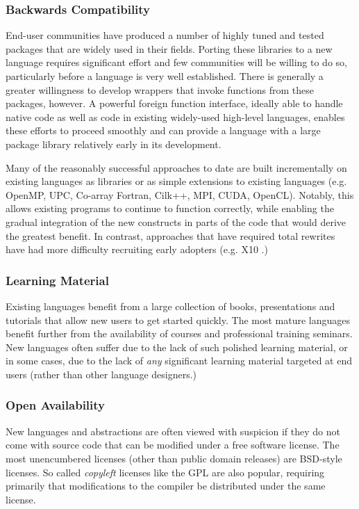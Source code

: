 \documentclass[12pt]{article}
\begin{document}
\subsubsection{Backwards Compatibility}
End-user communities have produced a number of highly tuned and tested packages that are widely used in their fields. Porting these libraries to a new language requires significant effort and few communities will be willing to do so, particularly before a language is very well established. There is generally a greater willingness to develop wrappers that invoke functions from these packages, however. A powerful foreign function interface, ideally able to handle native code as well as code in existing widely-used high-level languages, enables these efforts to proceed smoothly and can provide a language with a large package library relatively early in its development. 

Many of the reasonably successful approaches to date are built incrementally on existing languages as libraries or as simple  extensions to existing languages (e.g. OpenMP, UPC, Co-array Fortran, Cilk++, MPI, CUDA, OpenCL). Notably, this allows existing programs to continue to function correctly, while enabling the gradual integration of the new constructs in parts of the code that would derive the greatest benefit. In contrast, approaches that have required total rewrites have had more difficulty recruiting early adopters (e.g. X10 \cite{charles2005x10}.)

\subsubsection{Learning Material}
Existing languages benefit from a large collection of books, presentations and tutorials that allow new users to get started quickly. The most mature languages benefit further from the availability of courses and professional training seminars. New languages often suffer due to the lack of such polished learning material, or in some cases, due to the lack of {\it any} significant learning material targeted at end users (rather than other language designers.)

\subsubsection{Open Availability}
New languages and abstractions are often viewed with suspicion if they do not come with source code that can be modified under a free software license. The most unencumbered licenses (other than public domain releases) are BSD-style licenses. So called {\it copyleft} licenses like the GPL are also popular, requiring primarily that modifications to the compiler be distributed under the same license.
\end{document}
